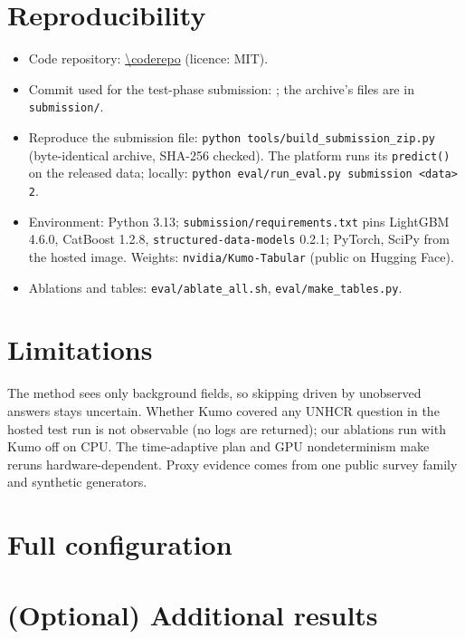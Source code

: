 \documentclass{article}
\begin{document}
\section{Reproducibility}
\label{sec:repro}

\begin{itemize}[leftmargin=*]
  \item Code repository: \url{\coderepo} (licence: MIT).
  \item Commit used for the test-phase submission: \texttt{\codecommit}; the archive's files are in \texttt{submission/}.
  \item Reproduce the submission file: \texttt{python tools/build\_submission\_zip.py} (byte-identical archive, SHA-256 checked). The platform runs its \texttt{predict()} on the released data; locally: \texttt{python eval/run\_eval.py submission <data> 2}.
  \item Environment: Python 3.13; \texttt{submission/requirements.txt} pins LightGBM 4.6.0, CatBoost 1.2.8, \texttt{structured-data-models} 0.2.1; PyTorch, SciPy from the hosted image. Weights: \texttt{nvidia/Kumo-Tabular} (public on Hugging Face).
  \item Ablations and tables: \texttt{eval/ablate\_all.sh}, \texttt{eval/make\_tables.py}.
\end{itemize}

\section{Limitations}
\label{sec:limitations}

The method sees only background fields, so skipping driven by unobserved answers stays uncertain. Whether Kumo covered any UNHCR question in the hosted test run is not observable (no logs are returned); our ablations run with Kumo off on CPU. The time-adaptive plan and GPU nondeterminism make reruns hardware-dependent. Proxy evidence comes from one public survey family and synthetic generators.




\clearpage
\appendix

\section{Full configuration}
\label{app:config}


\section{(Optional) Additional results}

\end{document}
